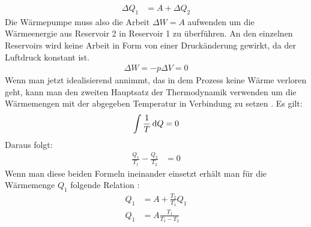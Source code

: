 \begin{align}
                \Delta Q_{1}    &= A + \Delta Q_{2} %
\end{align}
%
Die Wärmepumpe muss also die Arbeit $\Delta W = A$ aufwenden um die Wärmeenergie aus Reservoir 2 in Reservoir 1 zu überführen.
An den einzelnen Reservoirs wird keine Arbeit in Form von einer Druckänderung gewirkt, da der Luftdruck konstant ist.
\begin{align*}
    \Delta W = - p \Delta V = 0 
\end{align*}
Wenn man jetzt idealisierend annimmt, das in dem Prozess keine Wärme verloren geht, kann man den zweiten Hauptsatz der Thermodynamik
verwenden um die Wärmemengen mit der abgegeben Temperatur in Verbindung zu setzen \cite[vgl.][1]{man:v206}. 
Es gilt:
\begin{align*}
    \int \frac{1}{T} \diff Q = 0 %
\end{align*}
Daraus folgt:
\begin{align}
    \frac{Q_{1}}{T_{1}} - \frac{Q_{2}}{T_{2}} &= 0
\end{align}
Wenn man diese beiden Formeln ineinander einsetzt erhält man für die Wärmemenge $Q_1$ folgende Relation \cite{man:v206}: 
\begin{align}
\nonumber    Q_1 &= A + \frac{T_2}{T_1}Q_1 \\
    Q_1 &= A \frac{T_1}{T_1 - T_2}
\end{align}
